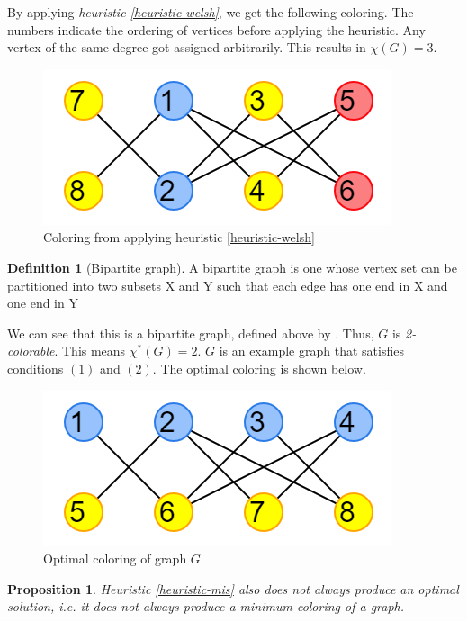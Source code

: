\documentclass{article}
\newcounter{heuristic} \setcounter{heuristic}{0}
\newtheorem{prop}{Proposition}
\theoremstyle{definition}
\newtheorem{definition}{Definition}
\begin{document}
By applying \emph{heuristic \ref{heuristic-welsh}}, we get the following coloring. The numbers indicate the ordering of vertices before applying the heuristic. Any vertex of the same degree got assigned arbitrarily. This results in \(\chi(G) = 3\).

\begin{figure}[H]
\centering
\includegraphics[scale=0.6]{images/graph-2.png}
\caption{Coloring from applying heuristic \ref{heuristic-welsh}}
\end{figure}

\begin{definition}[Bipartite graph]
A bipartite graph is one whose vertex set can be partitioned into two subsets X and Y such that each edge has one end in X and one end in Y
\end{definition}

We can see that this is a bipartite graph, defined above by \cite{bondymurty}. Thus, \(G\) is \emph{2-colorable}. This means \(\chi^{*}(G) = 2\). \(G\) is an example graph that satisfies conditions \((1)\) and \((2)\). The optimal coloring is shown below.

\begin{figure}[H]
\centering
\includegraphics[scale=0.6]{images/graph-3.png}
\caption{Optimal coloring of graph \(G\)}
\end{figure}

\begin{prop}
Heuristic \ref{heuristic-mis} also does not always produce an optimal solution, i.e. it does not always produce a minimum coloring of a graph.
\end{prop}
\end{document}
